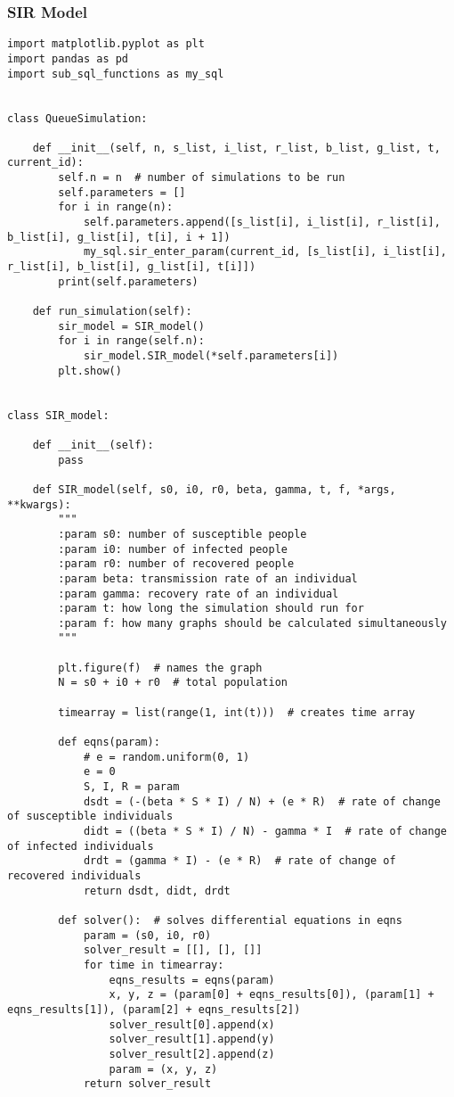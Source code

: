 \documentclass[11pt, a4paper]{article}
\begin{document}
\subsubsection{SIR Model}
\begin{lstlisting}
import matplotlib.pyplot as plt
import pandas as pd
import sub_sql_functions as my_sql


class QueueSimulation:

    def __init__(self, n, s_list, i_list, r_list, b_list, g_list, t, current_id):
        self.n = n  # number of simulations to be run
        self.parameters = []
        for i in range(n):
            self.parameters.append([s_list[i], i_list[i], r_list[i], b_list[i], g_list[i], t[i], i + 1])
            my_sql.sir_enter_param(current_id, [s_list[i], i_list[i], r_list[i], b_list[i], g_list[i], t[i]])
        print(self.parameters)

    def run_simulation(self):
        sir_model = SIR_model()
        for i in range(self.n):
            sir_model.SIR_model(*self.parameters[i])
        plt.show()


class SIR_model:

    def __init__(self):
        pass

    def SIR_model(self, s0, i0, r0, beta, gamma, t, f, *args, **kwargs):
        """
        :param s0: number of susceptible people
        :param i0: number of infected people
        :param r0: number of recovered people
        :param beta: transmission rate of an individual
        :param gamma: recovery rate of an individual
        :param t: how long the simulation should run for
        :param f: how many graphs should be calculated simultaneously
        """

        plt.figure(f)  # names the graph
        N = s0 + i0 + r0  # total population

        timearray = list(range(1, int(t)))  # creates time array

        def eqns(param):
            # e = random.uniform(0, 1)
            e = 0
            S, I, R = param
            dsdt = (-(beta * S * I) / N) + (e * R)  # rate of change of susceptible individuals
            didt = ((beta * S * I) / N) - gamma * I  # rate of change of infected individuals
            drdt = (gamma * I) - (e * R)  # rate of change of recovered individuals
            return dsdt, didt, drdt

        def solver():  # solves differential equations in eqns
            param = (s0, i0, r0)
            solver_result = [[], [], []]
            for time in timearray:
                eqns_results = eqns(param)
                x, y, z = (param[0] + eqns_results[0]), (param[1] + eqns_results[1]), (param[2] + eqns_results[2])
                solver_result[0].append(x)
                solver_result[1].append(y)
                solver_result[2].append(z)
                param = (x, y, z)
            return solver_result


\end{lstlisting}
\end{document}

